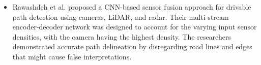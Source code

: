 \documentclass[rnd]{mas_proposal}
\begin{document}
\begin{itemize}
      \item Rawashdeh et al. \cite{rawashdeh2021drivable} proposed a CNN-based sensor fusion approach for drivable path detection using cameras, LiDAR, and radar. Their multi-stream encoder-decoder network was designed to account for the varying input sensor densities, with the camera having the highest density. The researchers demonstrated accurate path delineation by disregarding road lines and edges that might cause false interpretations.


\end{itemize}
\end{document}
